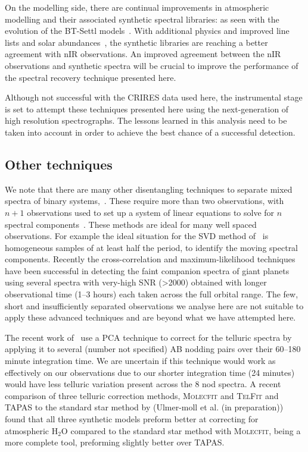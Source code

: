 \documentclass[fleqn,usenatbib]{mnras}
\begin{document}
On the modelling side, there are continual improvements in atmospheric modelling and their associated synthetic spectral libraries: as seen with the evolution of the {BT-Settl} models~\citep{allard_btsettl_2013}. With additional physics and improved line lists and solar abundances~\citep[e.g.][]{asplund_chemical_2009,caffau_solar_2011}, the synthetic libraries are reaching a better agreement with nIR observations. An improved agreement between the nIR observations and synthetic spectra will be crucial to improve the performance of the spectral recovery technique presented here.

Although not successful with the CRIRES data used here, the instrumental stage is set to attempt these techniques presented here using the next-generation of high resolution spectrographs. The lessons learned in this analysis need to be taken into account in order to achieve the best chance of a successful detection.


\subsection{Other techniques}
We note that there are many other disentangling techniques to separate mixed spectra of binary systems,~\citep[e.g.][]{hadrava_disentangling_2009}. These require more than two observations, with  \(n+1\) observations used to set up a system of linear equations to solve for \(n\) spectral components~\citep[e.g.][]{simon_disentangling_1994,czekala_disentangling_2017, sablowski_spectral_2016}. These methods are ideal for many well spaced observations. For example the ideal situation for the SVD method of~\citet{sablowski_spectral_2016} is homogeneous samples of at least half the period, to identify the moving spectral components.
{Recently the cross-correlation and maximum-likelihood techniques~\citep[e.g.][]{lockwood_nearir_2014, piskorz_evidence_2016} have been successful in detecting the faint companion spectra of giant planets using several spectra with very-high SNR (>2000) obtained with longer observational time (1--3 hours) each taken across the full orbital range.} The few, short and insufficiently separated observations we analyse here are not suitable to apply these advanced techniques and are beyond what we have attempted here.

{ The recent work of~\citet{piskorz_evidence_2016} use a PCA technique to correct for the telluric spectra by applying it to several (number not specified) AB nodding pairs over their 60--180 minute integration time. We are uncertain if this technique would work as effectively on our observations due to our shorter integration time (24 minutes) would have less telluric variation present across the 8 nod spectra. A recent comparison of three telluric correction methods, \textsc{Molecfit} and \textsc{TelFit} and {TAPAS} to the standard star method by (Ulmer-moll et al. (in preparation)) %
 found that all three synthetic models preform better at correcting for atmospheric H$_2$O compared to the standard star method with \textsc{Molecfit}, being a more complete tool, preforming slightly better over TAPAS.}
\end{document}
